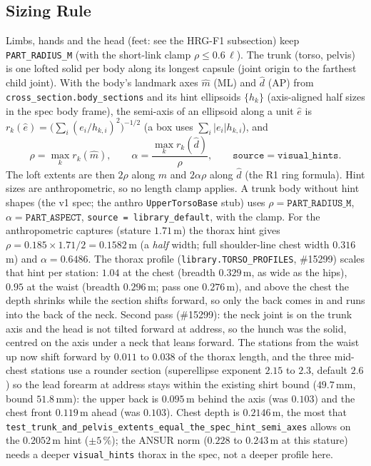 \subsection{Sizing Rule}
Limbs, hands and the head (feet: see the HRG-F1 subsection) keep \texttt{PART\_RADIUS\_M} (with the
short-link clamp $\rho\le 0.6\,\ell$). The trunk (torso, pelvis) is one lofted
solid per body along its longest capsule (joint origin to the farthest child
joint). With the body's landmark axes $\hat m$ (ML) and $\hat d$ (AP) from
\texttt{cross\_section.body\_sections} and its hint ellipsoids
$\{h_k\}$ (axis-aligned half sizes in the spec body frame), the semi-axis of
an ellipsoid along a unit $\hat e$ is $r_k(\hat e) = \bigl(\sum_i (e_i/h_{k,i})^2\bigr)^{-1/2}$
(a box uses $\sum_i |e_i| h_{k,i}$), and
\[
\rho = \max_k r_k(\hat m), \qquad \alpha = \frac{\max_k r_k(\hat d)}{\rho},
\qquad \texttt{source} = \texttt{visual\_hints}.
\]
The loft extents are then $2\rho$ along $\hat m$ and $2\alpha\rho$ along
$\hat d$ (the R1 ring formula). Hint sizes are anthropometric, so no
length clamp applies. A trunk body without hint shapes (the v1 spec; the
anthro \texttt{UpperTorsoBase} stub) uses $\rho=\texttt{PART\_RADIUS\_M}$,
$\alpha=\texttt{PART\_ASPECT}$, \texttt{source = library\_default}, with the
clamp. For the anthropometric captures (stature $1.71$\,m) the thorax hint
gives $\rho = 0.185\times1.71/2 = 0.1582$\,m (a \emph{half} width; full
shoulder-line chest width $0.316$\,m) and $\alpha = 0.6486$.
The thorax profile (\texttt{library.TORSO\_PROFILES}, \#15299) scales that hint
per station: $1.04$ at the chest (breadth $0.329$\,m, as wide as the hips),
$0.95$ at the waist (breadth $0.296$\,m; pass one $0.276$\,m), and above the
chest the depth shrinks while the section shifts forward, so only the back
comes in and runs into the back of the neck. Second pass (\#15299): the neck
joint is on the trunk axis and the head is not tilted forward at address, so
the hunch was the solid, centred on the axis under a neck that leans forward.
The stations from the waist up now shift forward by $0.011$ to $0.038$ of the
thorax length, and the three mid-chest stations use a rounder section
(superellipse exponent $2.15$ to $2.3$, default $2.6$) so the lead forearm at
address stays within the existing shirt bound ($49.7$\,mm, bound $51.8$\,mm): the upper back is $0.095$\,m behind the axis (was $0.103$) and
the chest front $0.119$\,m ahead (was $0.103$). Chest depth is $0.2146$\,m,
the most that
\texttt{test\_trunk\_and\_pelvis\_extents\_equal\_the\_spec\_hint\_semi\_axes}
allows on the $0.2052$\,m hint ($\pm5\,\%$); the ANSUR norm ($0.228$ to
$0.243$\,m at this stature) needs a deeper \texttt{visual\_hints} thorax in the
spec, not a deeper profile here.

